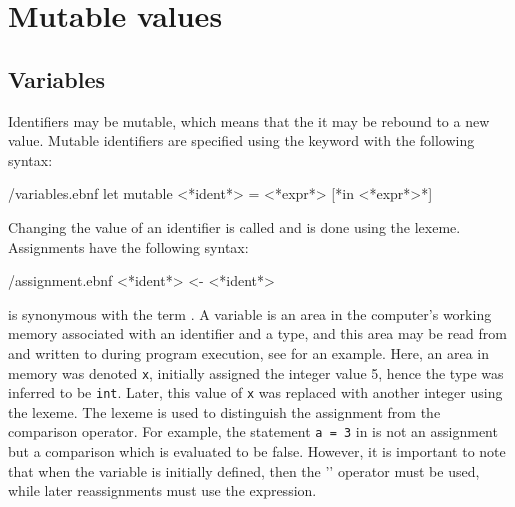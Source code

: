 \documentclass[springer.tex]{subfiles}
\begin{document}
\chapter{Mutable values}
\section{Variables}
\label{sec:mutableValues}
Identifiers may be mutable, which means that the it may be rebound to a new value. Mutable identifiers are specified using the  keyword with the following syntax:
%
\begin{verbatimwrite}{\ebnf/variables.ebnf}
let mutable <*ident*> = <*expr*> [*in <*expr*>*]
\end{verbatimwrite}
%
Changing the value of an identifier is called  and is done using the \idx[{<-}@\lstinline{<-}]{\lexeme{<-}} lexeme. Assignments have the following syntax:
%
\begin{verbatimwrite}{\ebnf/assignment.ebnf}
<*ident*> <- <*ident*>
\end{verbatimwrite}
%
 is synonymous with the term . A variable is an area in the computer's working memory associated with an identifier and a type, and this area may be read from and written to during program execution, see  for an example.
%
%
Here, an area in memory was denoted \lstinline{x}, initially assigned the integer value 5, hence the type was inferred to be \lstinline|int|.  Later, this value of \lstinline{x} was replaced with another integer using the \lexeme{<-} lexeme. The \lexeme{<-} lexeme is used to distinguish the assignment from the comparison operator. For example, the statement \lstinline{a = 3} in  is not an assignment but a comparison which is evaluated to be false. 
%
%
%
However, it is important to note that when the variable is initially defined, then the '\lexeme{=}' operator must be used, while later reassignments must use the \lexeme{<-} expression.
\end{document}
